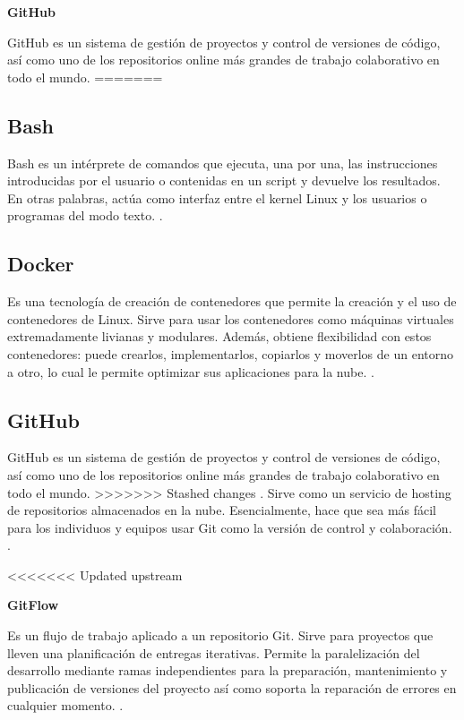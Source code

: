 \documentclass[12pt,letterpaper]{article}
\begin{document}
\item\textbf{GitHub}
\item GitHub es un sistema de gesti\'on de proyectos y control de versiones de c\'odigo, as\'i como uno de los repositorios online m\'as grandes de trabajo colaborativo en todo el mundo.
=======
\subsection*{Bash}
Bash es un int\'erprete de comandos que ejecuta, una por una, las instrucciones introducidas por el usuario o contenidas en un script y devuelve los resultados. En otras palabras, act\'ua como interfaz entre el kernel Linux y los usuarios o programas del modo texto.
 \cite[(Canepa, G. 2018)]{ref3}.

\subsection*{Docker}
Es una tecnolog\'ia de creación de contenedores que permite la creaci\'on y el uso de contenedores de Linux.
Sirve para usar los contenedores como m\'aquinas virtuales extremadamente livianas y modulares. Adem\'as, obtiene flexibilidad con estos contenedores: puede crearlos, implementarlos, copiarlos y moverlos de un entorno a otro, lo cual le permite optimizar sus aplicaciones para la nube.
 \cite[( RedHat. s.f.)]{ref4}.

\subsection*{GitHub}
GitHub es un sistema de gesti\'on de proyectos y control de versiones de c\'odigo, as\'i como uno de los repositorios online m\'as grandes de trabajo colaborativo en todo el mundo.
>>>>>>> Stashed changes
 \cite[(Hostinger Tutoriales. 2019)]{ref5}.
Sirve como un servicio de hosting de repositorios almacenados en la nube. Esencialmente, hace que sea m\'as f\'acil para los individuos y equipos usar Git como la versi\'on de control y colaboraci\'on.
\cite[(Kinsta. 2020)]{ref6}.

<<<<<<< Updated upstream
\item\textbf{GitFlow}
\item Es un flujo de trabajo aplicado a un repositorio Git. 
Sirve para proyectos que lleven una planificaci\'on de entregas iterativas. Permite la paralelización del desarrollo mediante ramas independientes para la preparaci\'on, mantenimiento y publicaci\'on de versiones del proyecto as\'i como soporta la reparaci\'on de errores en cualquier momento.
\cite[(Claventy. 2020)]{ref7}.
\end{document}
